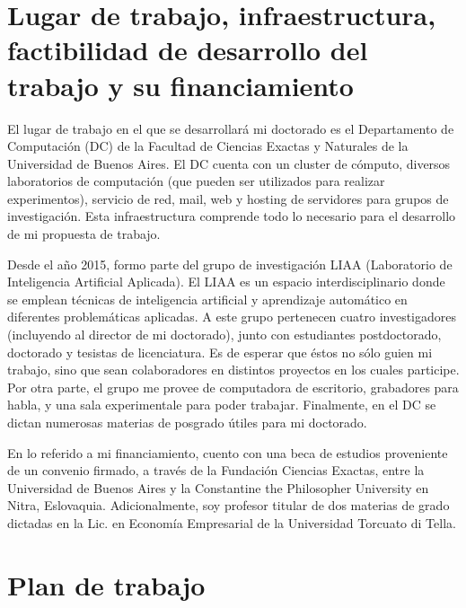 \documentclass{article}
\begin{document}
\section{Lugar de trabajo, infraestructura, factibilidad de desarrollo del trabajo y su financiamiento}

El lugar de trabajo en el que se desarrollará mi doctorado es el Departamento de Computación (DC) de la Facultad de Ciencias Exactas y Naturales de la Universidad de Buenos Aires. El DC cuenta con un cluster de cómputo, diversos laboratorios de computación (que pueden ser utilizados para realizar experimentos), servicio de red, mail, web y hosting de servidores para grupos de investigación. Esta infraestructura comprende todo lo necesario para el desarrollo de mi propuesta de trabajo.

Desde el año 2015, formo parte del grupo de investigación LIAA (Laboratorio de Inteligencia Artificial Aplicada). El LIAA es un espacio interdisciplinario donde se emplean técnicas de inteligencia artificial y aprendizaje automático en diferentes problemáticas aplicadas. A este grupo pertenecen cuatro investigadores (incluyendo al director de mi doctorado), junto con estudiantes postdoctorado, doctorado y tesistas de licenciatura. Es de esperar que éstos no sólo guien mi trabajo, sino que sean colaboradores en distintos proyectos en los cuales participe. Por otra parte, el grupo me provee de computadora de escritorio, grabadores para habla, y una sala experimentale para poder trabajar. Finalmente, en  el DC se dictan numerosas materias de posgrado útiles para mi doctorado.

En lo referido a mi financiamiento, cuento con una beca de estudios proveniente de un convenio firmado, a través de la Fundación Ciencias Exactas, entre la Universidad de Buenos Aires y la Constantine the Philosopher University en Nitra, Eslovaquia. Adicionalmente, soy profesor titular de dos materias de grado dictadas en la Lic. en Economía Empresarial de la Universidad Torcuato di Tella.


\section{Plan de trabajo}
\end{document}

